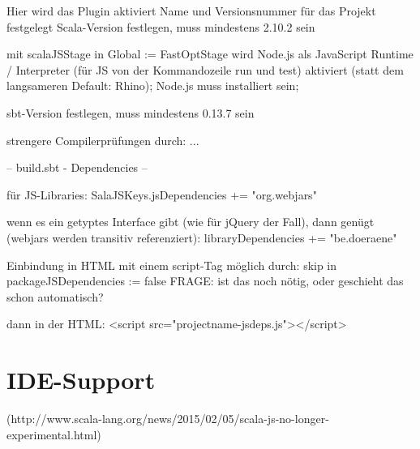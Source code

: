 \documentclass[a4paper, 12pt, hidelinks, listof=totoc, listoftables=totoc, bibliography=totoc]{scrreprt}
\begin{document}
Hier wird das Plugin aktiviert
Name und Versionsnummer für das Projekt festgelegt
Scala-Version festlegen, muss mindestens 2.10.2 sein

mit scalaJSStage in Global := FastOptStage wird Node.js als JavaScript Runtime / Interpreter (für JS von der Kommandozeile run und test) aktiviert (statt dem langsameren Default: Rhino); Node.js muss installiert sein;


sbt-Version festlegen, muss mindestens 0.13.7 sein


strengere Compilerprüfungen durch: ...


-- build.sbt - Dependencies --

für JS-Libraries:
SalaJSKeys.jsDependencies += "org.webjars" %

wenn es ein getyptes Interface gibt (wie für jQuery der Fall), dann genügt (webjars werden transitiv referenziert):
libraryDependencies += "be.doeraene" %

Einbindung in HTML mit einem script-Tag möglich durch:
skip in packageJSDependencies := false
FRAGE: ist das noch nötig, oder geschieht das schon automatisch?

dann in der HTML:
<script src="projectname-jsdeps.js"></script>



































\section{IDE-Support}
(http://www.scala-lang.org/news/2015/02/05/scala-js-no-longer-experimental.html)
\end{document}

